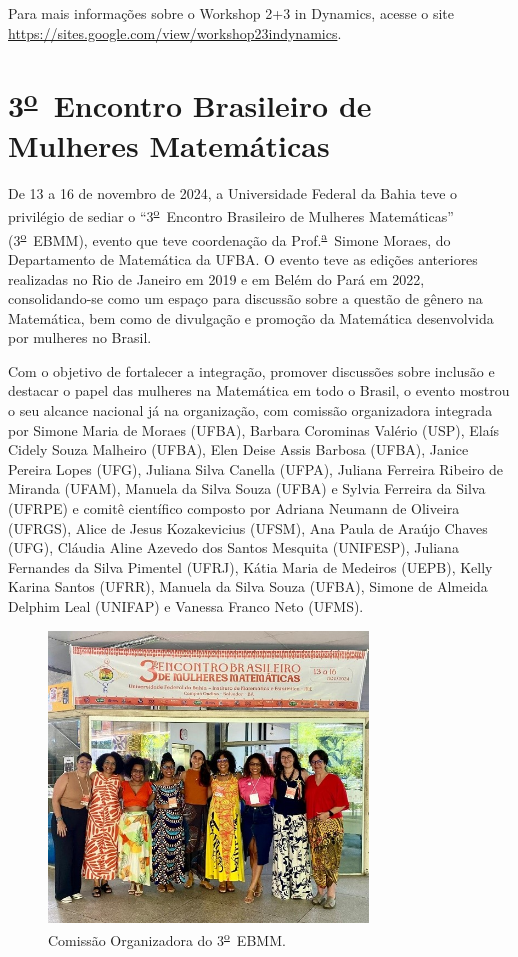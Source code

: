 \documentclass{hipatia}
\newcommand{\superau}{\textsuperscript{\underline{a}}~}
\newcommand{\superou}{\textsuperscript{\underline{o}}~}
\begin{document}
Para mais informações sobre o Workshop 2+3 in Dynamics, acesse o site
\href{https://sites.google.com/view/workshop23indynamics}{https://sites.google.com/view/workshop23indynamics}.


\section{3\superou Encontro Brasileiro de Mulheres Matemáticas }

De 13 a 16 de novembro de 2024, a Universidade Federal da Bahia teve o privilégio de sediar o ``3\superou Encontro Brasileiro de Mulheres Matemáticas'' (3\superou EBMM), evento que teve coordenação da Prof.\superau Simone Moraes, do Departamento de Matemática da UFBA.
O evento teve as edições anteriores realizadas no Rio de Janeiro em 2019 e em Belém do Pará em 2022, consolidando-se como um espaço para discussão sobre a questão de gênero na Matemática, bem como de divulgação e promoção da Matemática desenvolvida por mulheres no Brasil.

Com o objetivo de fortalecer a integração, promover discussões sobre inclusão e destacar o papel das mulheres na Matemática em todo o Brasil, o evento mostrou o seu alcance nacional já na organização, com comissão organizadora integrada por Simone Maria de Moraes (UFBA), Barbara Corominas Valério (USP), Elaís Cidely Souza Malheiro (UFBA), Elen Deise Assis Barbosa (UFBA), Janice Pereira Lopes (UFG), Juliana Silva Canella (UFPA), Juliana Ferreira Ribeiro de Miranda (UFAM), Manuela da Silva Souza (UFBA) e Sylvia Ferreira da Silva (UFRPE) e comitê científico composto por Adriana Neumann de Oliveira (UFRGS), Alice de Jesus Kozakevicius (UFSM), Ana Paula de Araújo Chaves (UFG), Cláudia Aline Azevedo dos Santos Mesquita (UNIFESP), Juliana Fernandes da Silva Pimentel (UFRJ), Kátia Maria de Medeiros (UEPB), Kelly Karina Santos (UFRR), Manuela da Silva Souza (UFBA), Simone de Almeida Delphim Leal (UNIFAP) e Vanessa Franco Neto (UFMS).

\begin{figure}[htb]
    \centering
    \includegraphics[width=8.5cm]{EBMM3.jpg}
    \caption{Comissão Organizadora do 3\superou EBMM.}
 \label{EBMM3}
\end{figure}
\end{document}
